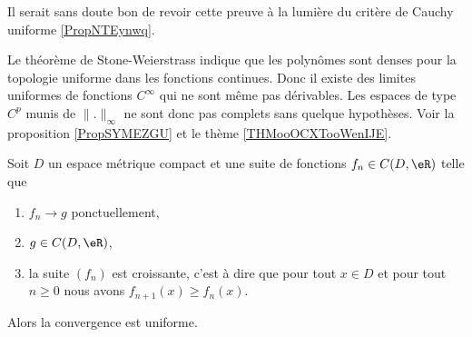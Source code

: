 \begin{probleme}
Il serait sans doute bon de revoir cette preuve à la lumière du critère de Cauchy uniforme \ref{PropNTEynwq}.
\end{probleme}


\begin{normaltext}
    Le théorème de Stone-Weierstrass indique que les polynômes sont denses pour la topologie uniforme dans les fonctions continues. Donc il existe des limites uniformes de fonctions \( C^{\infty}\) qui ne sont même pas dérivables. Les espaces de type \( C^p\) munis de \( \| . \|_{\infty}\) ne sont donc pas complets sans quelque hypothèses. Voir la proposition \ref{PropSYMEZGU} et le thème \ref{THMooOCXTooWenIJE}.
\end{normaltext}

\begin{theorem} \label{ThoUFPLEZh}
    Soit \( D\) un espace métrique compact et une suite de fonctions \( f_n\in C(D,\eR)\) telle que
    \begin{enumerate}
        \item
            \( f_n\to g\) ponctuellement,
        \item
            \( g\in C(D,\eR)\),
        \item
            la suite \( (f_n)\) est croissante, c'est à dire que pour tout \( x\in D\) et pour tout \( n\geq 0\) nous avons \( f_{n+1}(x)\geq f_n(x)\).
    \end{enumerate}
    Alors la convergence est uniforme.
\end{theorem}

